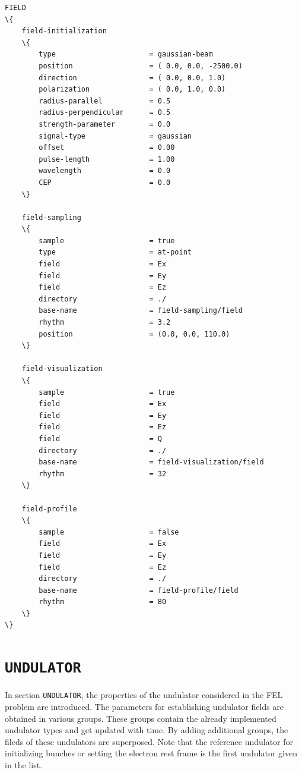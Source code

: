 \begin{snugshade}
\begin{Verbatim}[fontsize=\small, tabsize=4, fontfamily=courier, fontseries=b, commandchars=\\\{\}, obeytabs]
FIELD
\{
	field-initialization
	\{
		type					  = gaussian-beam
		position				  = ( 0.0, 0.0, -2500.0)
		direction				  = ( 0.0, 0.0, 1.0)
		polarization			  = ( 0.0, 1.0, 0.0)
		radius-parallel			  = 0.5
		radius-perpendicular	  = 0.5
		strength-parameter		  = 0.0
		signal-type				  = gaussian
		offset					  = 0.00
		pulse-length			  = 1.00
		wavelength				  = 0.0
		CEP						  = 0.0
	\}
	
	field-sampling
	\{
		sample					  = true
		type					  = at-point
		field					  = Ex
		field					  = Ey
		field					  = Ez
		directory				  = ./
		base-name				  = field-sampling/field
		rhythm					  = 3.2
		position				  = (0.0, 0.0, 110.0)
	\}
	
	field-visualization
	\{
		sample					  = true
		field					  = Ex
		field					  = Ey
		field					  = Ez
		field					  = Q
		directory				  = ./
		base-name				  = field-visualization/field
		rhythm					  = 32
	\}
	
	field-profile
	\{
		sample					  = false
		field					  = Ex
		field					  = Ey
		field					  = Ez
		directory				  = ./
		base-name				  = field-profile/field
		rhythm					  = 80
	\}
\}
\end{Verbatim}
\end{snugshade}

\section{\texttt{UNDULATOR}}

In section \texttt{UNDULATOR}, the properties of the undulator considered in the FEL problem are introduced.
%
The parameters for establishing undulator fields are obtained in various groups.
%
These groups contain the already implemented undulator types and get updated with time.
%
By adding additional groups, the fileds of these undulators are superposed.
%
Note that the reference undulator for initializing bunches or setting the electron rest frame is the first undulator given in the list.

